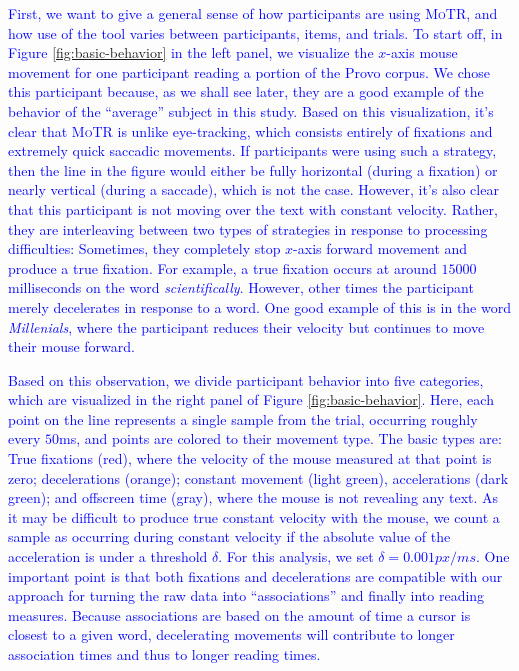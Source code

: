 \documentclass[12pt]{article}
\newcommand{\motr}{\textsc{MoTR}\xspace}
\newcommand{\word}[1]{\textit{#1}}
\newcommand{\change}[1]{\textcolor{blue}{#1}}
\begin{document}
{\change{First, we want to give a general sense of how participants are using \motr, and how use of the tool varies between participants, items, and trials. To start off, in Figure \ref{fig:basic-behavior} in the left panel, we visualize the $x$-axis mouse movement for one participant reading a portion of the Provo corpus. We chose this participant because, as we shall see later, they are a good example of the behavior of the ``average'' subject in this study. Based on this visualization, it's clear that \motr is unlike eye-tracking, which consists entirely of fixations and extremely quick saccadic movements. If participants were using such a strategy, then the line in the figure would either be fully horizontal (during a fixation) or nearly vertical (during a saccade), which is not the case. However, it's also clear that this participant is not moving over the text with constant velocity. Rather, they are interleaving between two types of strategies in response to processing difficulties: Sometimes, they completely stop $x$-axis forward movement and produce a true fixation. For example, a true fixation occurs at around $15000$ milliseconds on the word \word{scientifically}. However, other times the participant merely decelerates in response to a word. One good example of this is in the word \textit{Millenials}, where the participant reduces their velocity but continues to move their mouse forward.}

\change{Based on this observation, we divide participant behavior into five categories, which are visualized in the right panel of Figure \ref{fig:basic-behavior}. Here, each point on the line represents a single sample from the trial, occurring roughly every $50$ms, and points are colored to their movement type. The basic types are: True fixations (red), where the velocity of the mouse measured at that point is zero; decelerations (orange); constant movement (light green), accelerations (dark green); and offscreen time (gray), where the mouse is not revealing any text. As it may be difficult to produce true constant velocity with the mouse, we count a sample as occurring during constant velocity if the absolute value of the acceleration is under a threshold $\delta$. For this analysis, we set $\delta=0.001px/ms$. One important point is that both fixations and decelerations are compatible with our approach for turning the raw data into ``associations'' and finally into reading measures. Because associations are based on the amount of time a cursor is closest to a given word, decelerating movements will contribute to longer association times and thus to longer reading times.}

}
\end{document}
